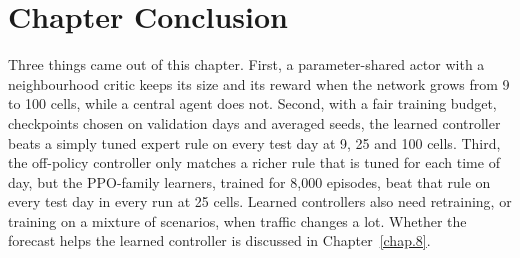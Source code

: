 \section{Chapter Conclusion}
\label{sec:marl-conclusion}
Three things came out of this chapter. First, a parameter-shared actor with a neighbourhood critic keeps its size and its reward when the network grows from 9 to 100 cells, while a central agent does not. Second, with a fair training budget, checkpoints chosen on validation days and averaged seeds, the learned controller beats a simply tuned expert rule on every test day at 9, 25 and 100 cells. Third, the off-policy controller only matches a richer rule that is tuned for each time of day, but the PPO-family learners, trained for 8{,}000 episodes, beat that rule on every test day in every run at 25 cells. Learned controllers also need retraining, or training on a mixture of scenarios, when traffic changes a lot. Whether the forecast helps the learned controller is discussed in Chapter~\ref{chap.8}.
